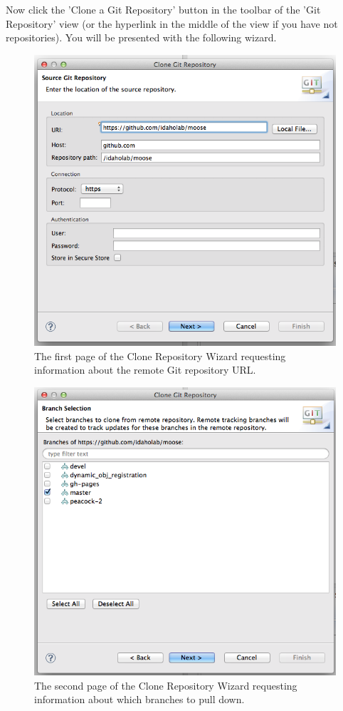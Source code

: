 Now click the 'Clone a Git Repository' button in the toolbar of the 'Git
Repository' view (or the hyperlink in the middle of the view if you have
not repositories). You will be presented with the following wizard.

\begin{figure}[htbp]
\centering
\includegraphics[width=\textwidth]{figures/Clone_wizard.png}
\caption{The first page of the Clone Repository Wizard requesting information about the remote Git repository URL.}
\end{figure}
\begin{figure}[htbp]
\centering
\includegraphics[width=\textwidth]{figures/Clone_wizard2.png}
\caption{The second page of the Clone Repository Wizard requesting information about which branches to pull down.}
\end{figure}
